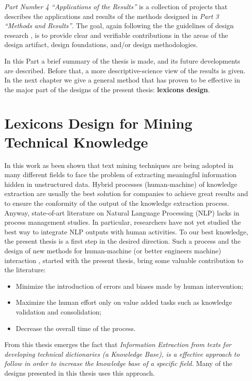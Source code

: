 \documentclass[b5paper,]{book}
\theoremstyle{definition}
\theoremstyle{definition}
\theoremstyle{definition}
\theoremstyle{remark}
\begin{document}
\emph{Part Number 4 ``Applications of the Results''} is a collection of
projects that describes the applications and results of the methods
designed in \emph{Part 3 ``Methods and Results''}. The goal, again
following the the guidelines of design research
\citep{bichler2006design}, is to provide clear and verifiable
contributions in the areas of the design artifact, design foundations,
and/or design methodologies.

In this Part a brief summary of the thesis is made, and its future
developments are described. Before that, a more descriptive-science view
of the results is given. In the next chapter we give a general method
that has proven to be effective in the major part of the designs of the
present thesis: \textbf{lexicons design}.

\chapter{Lexicons Design for Mining Technical
Knowledge}\label{sotadocumentsunderstandlexicons}

In this work as been shown that text mining techniques are being adopted
in many different fields to face the problem of extracting meaningful
information hidden in unstructured data. Hybrid processes
(human-machine) of knowledge extraction are usually the best solution
for companies to achieve great results and to ensure the conformity of
the output of the knowledge extraction process. Anyway, state-of-art
literature on Natural Language Processing (NLP) lacks in process
management studies. In particular, researchers have not yet studied the
best way to integrate NLP outputs with human activities. To our best
knowledge, the present thesis is a first step in the desired direction.
Such a process and the design of new methods for human-machine (or
better engineers machine) interaction , started with the present thesis,
bring some valuable contribution to the literature:

\begin{itemize}
\item
  Minimize the introduction of errors and biases made by human
  intervention;
\item
  Maximize the human effort only on value added tasks such as knowledge
  validation and consolidation;
\item
  Decrease the overall time of the process.
\end{itemize}

From this thesis emerges the fact that \emph{Information Extraction from
texts for developing technical dictionaries (a Knowledge Base), is a
effective approach to follow in order to increase the knowledge base of
a specific field.} Many of the designs presented in this thesis uses
this approach.
\end{document}
